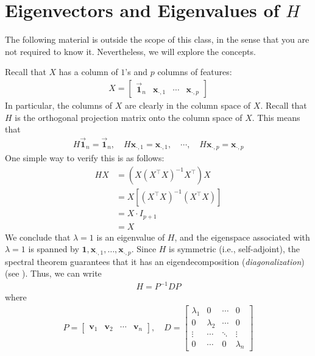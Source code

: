 \documentclass[12pt, a4paper]{article}
\theoremstyle{definition}
\begin{document}
	\section*{Eigenvectors and Eigenvalues of $H$}
	The following material is outside the scope of this class, in the sense that you are not
	required to know it. Nevertheless, we will explore the concepts.
	
	Recall that $X$ has a column of $1$'s and $p$ columns of features:
	\begin{align*}
		X = \begin{bmatrix}
			\vec{\mathbf{1}}_n & \mathbf{x}_{\cdot, 1} & \cdots & \mathbf{x}_{\cdot, p}
		\end{bmatrix}
	\end{align*}
	In particular, the columns of $X$ are clearly in the column space of $X$.
	Recall that $H$ is the orthogonal projection matrix onto the column space of $X$.
	This means that
	\begin{align*}
		H\vec{\mathbf{1}}_n=\vec{\mathbf{1}}_n,\quad
		H\mathbf{x}_{\cdot, 1} = \mathbf{x}_{\cdot, 1},\quad
		\cdots,\quad
		H\mathbf{x}_{\cdot, p} = \mathbf{x}_{\cdot, p}
	\end{align*}
	One simple way to verify this is as follows:
	\begin{align*}
		HX &= (X(X^\top X)^{-1}X^\top)X\\
		&=X[(X^\top X)^{-1}(X^\top X)]\\
		&=X\cdot I_{p+1}\\
		&=X
	\end{align*}
	We conclude that $\lambda=1$ is an eigenvalue of $H$, and the eigenspace associated
	with $\lambda=1$ is spanned by $\mathbf{1},\mathbf{x}_{\cdot, 1},\ldots,\mathbf{x}_{\cdot, p}$.
	Since $H$ is symmetric (i.e., self-adjoint), the spectral theorem guarantees that it has an
	eigendecomposition (\textit{diagonalization}) (see \cite{axler}). Thus, we can write
	\begin{align*}
		H = P^{-1}DP
	\end{align*}
	where
	\begin{align*}
		P=\begin{bmatrix}
			\mathbf{v}_1 & \mathbf{v}_2 & \cdots & \mathbf{v}_n
		\end{bmatrix},
		\quad
		D=\begin{bmatrix}
			\lambda_1 &0 & \cdots & 0\\
			0 & \lambda_2 & \cdots & 0\\
			\vdots & \cdots & \ddots & \vdots\\
			0 & \cdots & 0 & \lambda_n
		\end{bmatrix}
	\end{align*}
\end{document}
